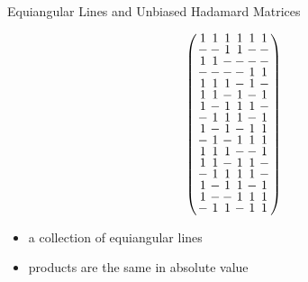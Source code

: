 \documentclass{beamer}
\begin{document}
\begin{frame}{Equiangular Lines and Unbiased Hadamard Matrices}

  \[
    \arraycolsep=1.0pt\def\arraystretch{0.75}
    \left(
    \begin{array}{cccccc}
      1&1&1&1&1&1\\
      -&-&1&1&-&-\\
      1&1&-&-&-&-\\
      -&-&-&-&1&1\\
      1&1&1&-&1&-\\
      1&1&-&1&-&1\\
      1&-&1&1&1&-\\
      -&1&1&1&-&1\\
      1&-&1&-&1&1\\
      -&1&-&1&1&1\\
      1&1&1&-&-&1\\
      1&1&-&1&1&-\\
      -&1&1&1&1&-\\
      1&-&1&1&-&1\\
      1&-&-&1&1&1\\
      -&1&1&-&1&1\\
    \end{array}
    \right)
  \]

  \begin{itemize}
    \item a collection of equiangular lines
    \item products are the same in absolute value
  \end{itemize}
  
\end{frame}
\end{document}
